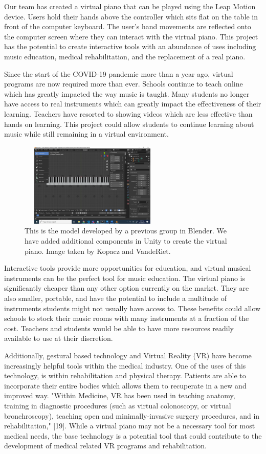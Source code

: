 \documentclass[conference,compsoc]{IEEEtran}
\begin{document}
Our team has created a virtual piano that can be played using the Leap Motion device. Users hold their hands above the controller which sits flat on the table in front of the computer keyboard. The user's hand movements are reflected onto the computer screen where they can interact with the virtual piano. This project has the potential to create interactive tools with an abundance of uses including music education, medical rehabilitation, and the replacement of a real piano.

Since the start of the COVID-19 pandemic more than a year ago, virtual programs are now required more than ever. Schools continue to teach online which has greatly impacted the way music is taught. Many students no longer have access to real instruments which can greatly impact the effectiveness of their learning. Teachers have resorted to showing videos which are less effective than hands on learning. This project could allow students to continue learning about music while still remaining in a virtual environment.

\begin{figure}[h]
\centering
\includegraphics[width=7cm, height=4cm]{IEEEtran/Picture2.png}
\centering
\caption{This is the model developed by a previous group in Blender. We have added additional components in Unity to create the virtual piano. Image taken by Kopacz and VandeRiet.}
\end{figure}

Interactive tools provide more opportunities for education, and virtual musical instruments can be the perfect tool for music education. The virtual piano is significantly cheaper than any other option currently on the market. They are also smaller, portable, and have the potential to include a multitude of instruments students might not usually have access to. These benefits could allow schools to stock their music rooms with many instruments at a fraction of the cost. Teachers and students would be able to have more resources readily available to use at their discretion.

Additionally, gestural based technology and Virtual Reality (VR) have become increasingly helpful tools within the medical industry. One of the uses of this technology, is within rehabilitation and physical therapy. Patients are able to incorporate their entire bodies which allows them to recuperate in a new and improved way. "Within Medicine, VR has been used in teaching anatomy, training
in diagnostic procedures (such as virtual colonoscopy, or virtual
bronchroscopy), teaching open and minimally-invasive surgery
procedures, and in rehabilitation," [19]. While a virtual piano may not be a necessary tool for most medical needs, the base technology is a potential tool that could contribute to the development of medical related VR programs and rehabilitation.
\end{document}
